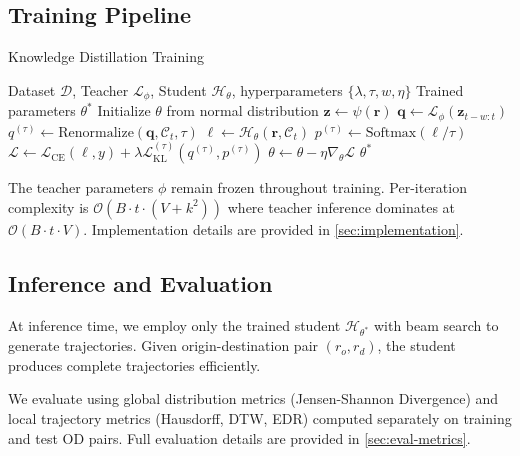 \subsection{Training Pipeline}
\label{sec:method-training}

\begin{algorithm}[t]
    \caption{Knowledge Distillation Training}
    \label{alg:distillation}
    \begin{algorithmic}[1]
        \Require Dataset $\mathcal{D}$, Teacher $\mathcal{L}_\phi$, Student $\mathcal{H}_\theta$, hyperparameters $\{\lambda, \tau, w, \eta\}$
        \Ensure Trained parameters $\theta^*$
        \State Initialize $\theta$ from normal distribution
        \State $\mathbf{z} \gets \psi(\mathbf{r})$ 
        \State $\mathbf{q} \gets \mathcal{L}_\phi(\mathbf{z}_{t-w:t})$ 
        \State $q^{(\tau)} \gets \text{Renormalize}(\mathbf{q}, \mathcal{C}_t, \tau)$ 
        \State $\boldsymbol{\ell} \gets \mathcal{H}_\theta(\mathbf{r}, \mathcal{C}_t)$ 
        \State $p^{(\tau)} \gets \text{Softmax}(\boldsymbol{\ell} / \tau)$
        \State $\mathcal{L} \gets \mathcal{L}_{\text{CE}}(\boldsymbol{\ell}, y) + \lambda \mathcal{L}_{\text{KL}}^{(\tau)}(q^{(\tau)}, p^{(\tau)})$
        \State $\theta \gets \theta - \eta \nabla_\theta \mathcal{L}$
        \EndFor
        \EndFor
        \State \Return $\theta^*$
    \end{algorithmic}
\end{algorithm}

The teacher parameters $\phi$ remain frozen throughout training. Per-iteration complexity is $\mathcal{O}(B \cdot t \cdot (V + k^2))$ where teacher inference dominates at $\mathcal{O}(B \cdot t \cdot V)$. Implementation details are provided in \autoref{sec:implementation}.

\subsection{Inference and Evaluation}
\label{sec:method-inference}

At inference time, we employ only the trained student $\mathcal{H}_{\theta^*}$ with beam search to generate trajectories. Given origin-destination pair $(r_o, r_d)$, the student produces complete trajectories efficiently.

We evaluate using global distribution metrics (Jensen-Shannon Divergence) and local trajectory metrics (Hausdorff, DTW, EDR) computed separately on training and test OD pairs. Full evaluation details are provided in \autoref{sec:eval-metrics}.